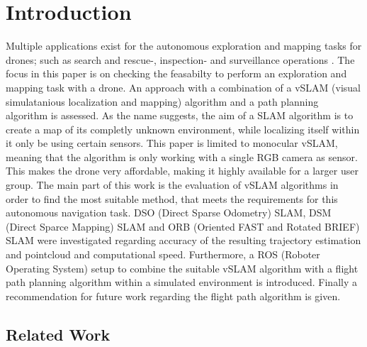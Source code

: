 \chapter{Introduction}

Multiple applications exist for the autonomous exploration and mapping tasks for drones;
 such as search and rescue-, inspection- and surveillance operations \cite{tasks}.
 The focus in this paper is on checking the feasabilty to perform an exploration and mapping task with a drone.
An approach with a combination of a vSLAM (visual simulatanious localization
and mapping) algorithm and a path planning algorithm is assessed. As the name 
suggests, the aim of a SLAM algorithm is to create a map of its completly
 unknown environment, while localizing itself within it only be using certain sensors.
 This paper is limited to monocular vSLAM, meaning that the algorithm is only working
 with a single RGB camera as sensor. This makes the drone very affordable, making it highly available for a larger user group.  
The main part of this work is the evaluation of vSLAM algorithms in order to find the 
most suitable method, that meets the requirements for this autonomous navigation task.
 DSO (Direct Sparse Odometry) SLAM, DSM (Direct Sparce Mapping) SLAM and ORB (Oriented FAST and Rotated BRIEF)
 SLAM were investigated regarding accuracy of the resulting trajectory estimation and pointcloud and computational speed. 
Furthermore, a ROS (Roboter Operating System) setup to combine the suitable vSLAM algorithm with a flight
 path planning algorithm within a simulated environment is introduced. Finally a recommendation
 for future work regarding 
the flight path algorithm is given.


\section{Related Work}

